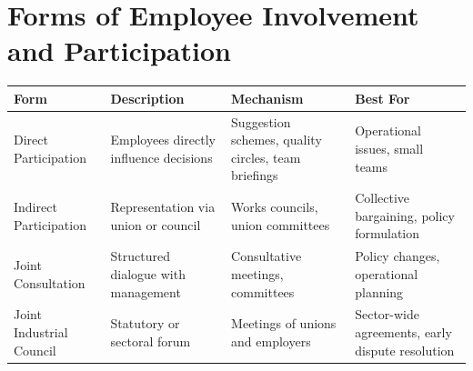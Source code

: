 \documentclass[10pt]{article}
\begin{document}
\section*{Forms of Employee Involvement and Participation}
\begin{center}
\begin{tabular}{|l|l|l|l|}
\hline
Form & Description & Mechanism & Best For \\
\hline
Direct Participation & Employees directly influence decisions & Suggestion schemes, quality circles, team briefings & Operational issues, small teams \\
\hline
Indirect Participation & Representation via union or council & Works councils, union committees & Collective bargaining, policy formulation \\
\hline
Joint Consultation & Structured dialogue with management & Consultative meetings, committees & Policy changes, operational planning \\
\hline
Joint Industrial Council & Statutory or sectoral forum & Meetings of unions and employers & Sector-wide agreements, early dispute resolution \\
\hline
\end{tabular}
\end{center}
\end{document}

